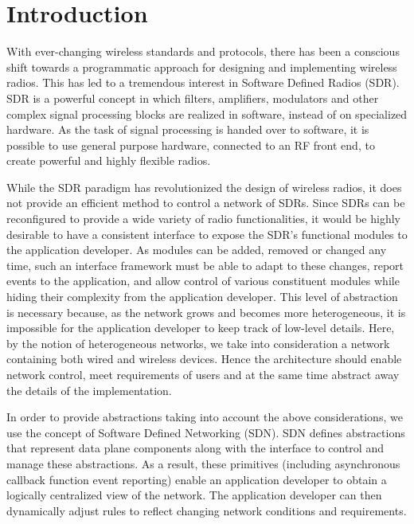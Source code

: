 \section{Introduction}
\label{sec:intro}
With ever-changing wireless standards and protocols, there has been a conscious shift towards a programmatic approach for designing and implementing wireless radios. This has led to a tremendous interest in Software Defined Radios (SDR). SDR is a powerful concept in which filters, amplifiers, modulators and other complex signal processing blocks are realized in software, instead of on specialized hardware. As the task of signal processing is handed over to software, it is possible to use general purpose hardware, connected to an RF front end, to create powerful and highly flexible radios.

While the SDR paradigm has revolutionized the design of wireless radios, it does not provide an efficient method to control a network of SDRs. Since SDRs can be reconfigured to provide a wide variety of radio functionalities, it would be highly desirable to have a consistent interface to expose the SDR's functional modules to the application developer. As modules can be added, removed or changed any time, such an interface framework must be able to adapt to these changes, report events to the application, and allow control of various constituent modules while hiding their complexity from the application developer. This level of abstraction is necessary because, as the network grows and becomes more heterogeneous, it is impossible for the application developer to keep track of low-level details. Here, by the notion of heterogeneous networks, we take into consideration a network containing both wired and wireless devices. Hence the architecture should enable network control, meet requirements of users and at the same time abstract away the details of the implementation.

In order to provide abstractions taking into account the above considerations, we use the concept of Software Defined Networking (SDN). SDN defines abstractions that represent data plane components along with the interface to control and manage these abstractions. As a result, these primitives (including asynchronous callback function event reporting) enable an application developer to obtain a logically centralized view of the network. The application developer can then dynamically adjust rules to reflect changing network conditions and requirements.

